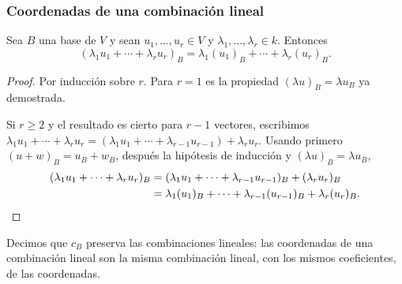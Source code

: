 \begin{frame}[allowframebreaks,t]
    \frametitle{Coordenadas de una combinación lineal}

    \begin{proposition}
        Sea \(B\) una base de \(V\) y sean \(u_1,\ldots,u_r\in V\) y
        \(\lambda_1,\ldots,\lambda_r\in k\). Entonces
        \[
            (\lambda_1u_1+\cdots+\lambda_ru_r)_B
            =\lambda_1(u_1)_B+\cdots+\lambda_r(u_r)_B.
        \]
    \end{proposition}

    \begin{proof}
        Por inducción sobre \(r\). Para \(r=1\) es la propiedad
        \((\lambda u)_B=\lambda u_B\) ya demostrada.

        Si \(r\geq2\) y el resultado es cierto para \(r-1\) vectores,
        escribimos
        \(\lambda_1u_1+\cdots+\lambda_ru_r
        =(\lambda_1u_1+\cdots+\lambda_{r-1}u_{r-1})+\lambda_ru_r\).
        Usando primero \((u+w)_B=u_B+w_B\), después la hipótesis de
        inducción y \((\lambda u)_B=\lambda u_B\),
        \begin{align*}
            (\lambda_1u_1+\cdots+\lambda_ru_r)_B
            &=(\lambda_1u_1+\cdots+\lambda_{r-1}u_{r-1})_B+(\lambda_ru_r)_B\\
            &=\lambda_1(u_1)_B+\cdots+\lambda_{r-1}(u_{r-1})_B
              +\lambda_r(u_r)_B.\qedhere
        \end{align*}
    \end{proof}

    \medskip

    Decimos que \(c_B\) \alert{preserva} las combinaciones lineales:
    las coordenadas de una combinación lineal son la misma combinación
    lineal, \alert{con los mismos coeficientes}, de las coordenadas.
\end{frame}


